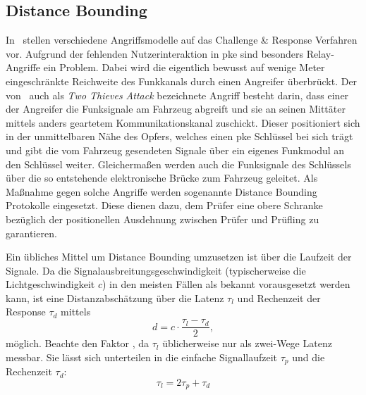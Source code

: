 \FloatBarrier{}

\subsection{\foreignlanguage{english}{Distance Bounding}}

In~\cite{Alrabady2005} stellen \citeauthor{Alrabady2005} verschiedene Angriffsmodelle auf das \foreignlanguage{english}{Challenge \& Response} Verfahren vor. Aufgrund der fehlenden Nutzerinteraktion in \gls{pke} sind besonders \foreignlanguage{english}{Relay}-Angriffe ein Problem. Dabei wird die eigentlich bewusst auf wenige Meter eingeschränkte Reichweite des Funkkanals durch einen Angreifer überbrückt. Der von~\citeauthor{Alrabady2005} auch als \emph{\foreignlanguage{english}{Two Thieves Attack}} bezeichnete Angriff besteht darin, dass einer der Angreifer die Funksignale am Fahrzeug abgreift und sie an seinen Mittäter mittels anders geartetem Kommunikationskanal zuschickt. Dieser positioniert sich in der unmittelbaren Nähe des Opfers, welches einen \gls{pke} Schlüssel bei sich trägt und gibt die vom Fahrzeug gesendeten Signale über ein eigenes Funkmodul an den Schlüssel weiter. Gleichermaßen werden auch die Funksignale des Schlüssels über die so entstehende elektronische Brücke zum Fahrzeug geleitet. Als Maßnahme gegen solche Angriffe werden sogenannte \foreignlanguage{english}{Distance Bounding} Protokolle eingesetzt. Diese dienen dazu, dem Prüfer eine obere Schranke bezüglich der positionellen Ausdehnung zwischen Prüfer und Prüfling zu garantieren.

Ein übliches Mittel um \foreignlanguage{english}{Distance Bounding} umzusetzen ist über die Laufzeit der Signale. Da die Signalausbreitungsgeschwindigkeit (typischerweise die Lichtgeschwindigkeit \(c\)) in den meisten Fällen als bekannt vorausgesetzt werden kann, ist eine Distanzabschätzung über die Latenz \(\tau_{l}\) und Rechenzeit der \foreignlanguage{english}{Response} \(\tau_{d}\) mittels
%
\begin{equation*}
    d = c \cdot \frac{\tau_{l} - \tau_{d}}{2} {,}
\end{equation*}
%
möglich. Beachte den Faktor , da \(\tau_{l}\) üblicherweise nur als zwei-Wege Latenz messbar. Sie lässt sich unterteilen in die einfache Signallaufzeit \(\tau_{p}\) und die Rechenzeit \(\tau_{d}\):
%
\begin{equation*}
    \tau_{l} = 2 \tau_{p} + \tau_{d}
\end{equation*}

